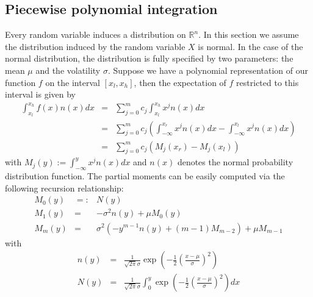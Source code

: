 \subsection{Piecewise polynomial integration}
Every random variable induces a distribution on $\mathbb R^n$. In this
section we assume the distribution induced by the random variable $X$
is normal. In the case of the normal distribution, the distribution is
fully specified by two parameters: the mean $\mu$ and the volatility
$\sigma$. Suppose we have a polynomial representation of our function
$f$ on the interval $[x_l, x_h]$, then the expectation of $f$ restricted to this
interval is given by
\begin{eqnarray}
\int_{x_l}^{x_h} f(x) n(x) dx &=&  \sum_{j=0}^m c_j \int_{x_l}^{x_h} x^j n(x) dx \\
  &=& \sum_{j=0}^m c_j \left( \int_{-\infty}^{x_r} x^j n(x) dx - \int_{-\infty}^{x_l} x^j n(x) dx \right)\\
  &=& \sum_{j=0}^m c_j \left(M_j(x_r)-M_j(x_l) \right)
\end{eqnarray}
with $M_j(y) := \int_{-\infty}^y x^j n(x) dx$ and $n(x)$ denotes the
normal probability distribution function. The partial moments can be easily
computed via the following recursion relationship:
\begin{eqnarray}
M_0(y) &=:& N(y) \\
M_1(y) &=& -\sigma^2 n(y)+\mu M_0(y) \\
M_m(y) &=& \sigma^2 \left(-y^{m-1} n(y)+(m-1) M_{m-2}\right)+\mu M_{m-1}  
\end{eqnarray}
with 
\begin{eqnarray}
n(y) &=& \frac{1}{\sqrt{2 \pi} \sigma} \exp(-\frac{1}{2} \left(\frac{x-\mu}{\sigma}\right)^2) \\
N(y) &=& \frac{1}{\sqrt{2 \pi} \sigma} \int_0^y \exp(-\frac{1}{2} \left(\frac{x-\mu}{\sigma}\right)^2) dx
\end{eqnarray}

